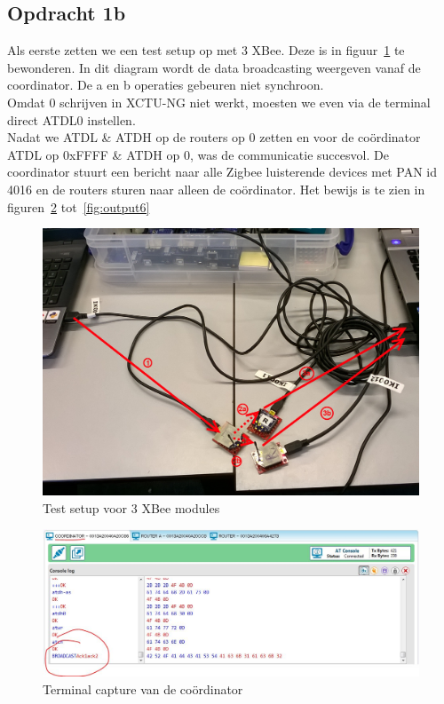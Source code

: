 \documentclass[12pt]{article}
\begin{document}
\subsection*{Opdracht 1b}
Als eerste zetten we een test setup op met 3 XBee. Deze is in figuur~\ref{fig:setup2} te bewonderen. In dit diagram wordt de data broadcasting weergeven vanaf de coordinator. De a en b operaties gebeuren niet synchroon.\\
Omdat 0 schrijven in XCTU-NG niet werkt, moesten we even via de terminal direct ATDL0 instellen. \\
Nadat we ATDL \& ATDH op de routers op 0 zetten en voor de co\"{o}rdinator ATDL op 0xFFFF \& ATDH op 0, was de communicatie succesvol. De coordinator stuurt een bericht naar alle Zigbee luisterende devices met PAN id 4016 en de routers sturen naar alleen de co\"{o}rdinator. Het bewijs is te zien in figuren~\ref{fig:output4} tot~\ref{fig:output6}
\begin{center}
\begin{figure}[h]
\includegraphics[scale=.25]{test_setup_2.jpg}
\caption{Test setup voor 3 XBee modules}
\label{fig:setup2}
\end{figure}
\end{center}
\begin{center}
\begin{figure}[h]
\includegraphics[scale=.7]{coord_capture.jpg}
\caption{Terminal capture van de co\"{o}rdinator}
\label{fig:output4}
\end{figure}
\end{center}
\end{document}
